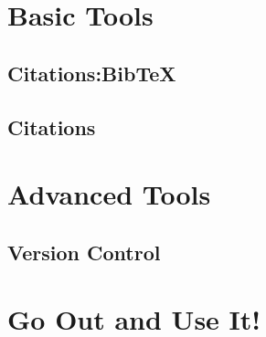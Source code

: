 \documentclass{beamer}
\begin{document}
\section{Basic Tools}
\subsection{Citations:BibTeX}
\subsection{Citations}

\section{Advanced Tools}
\subsection{Version Control}

\section{Go Out and Use It!}
\end{document}
